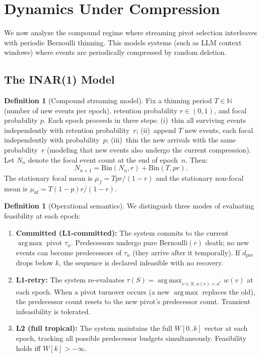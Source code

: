 \documentclass[11pt]{article}
\theoremstyle{plain}
\theoremstyle{definition}
\newtheorem{definition}[theorem]{Definition}
\theoremstyle{remark}
\newcommand{\N}{\mathbb{N}}
\newcommand{\dpre}[1][]{d_{\mathrm{pre}#1}}
\DeclareMathOperator*{\argmax}{arg\,max}
\begin{document}
\section{Dynamics Under Compression}\label{sec:dynamics}

We now analyze the compound regime where streaming pivot selection
interleaves with periodic Bernoulli thinning.  This models systems
(such as LLM context windows) where events are periodically compressed
by random deletion.

\subsection{The INAR(1) Model}\label{subsec:inar}

\begin{definition}[Compound streaming model]\label{def:compound}
Fix a thinning period $T \in \N$ (number of new events per epoch),
retention probability $r \in (0,1)$, and focal probability $p$.  Each
epoch proceeds in three steps: (i)~thin all surviving events
independently with retention probability~$r$; (ii)~append $T$ new
events, each focal independently with probability~$p$; (iii)~thin the
new arrivals with the same probability~$r$ (modeling that new events
also undergo the current compression).  Let $N_n$ denote the focal
event count at the end of epoch~$n$.  Then:
\begin{equation}\label{eq:inar}
  N_{n+1} = \mathrm{Bin}(N_n, r) + \mathrm{Bin}(T, pr).
\end{equation}
The stationary focal mean is $\mu_f = Tpr/(1-r)$ and the stationary
non-focal mean is $\mu_{\mathrm{nf}} = T(1-p)r/(1-r)$.
\end{definition}

\begin{definition}[Operational semantics]\label{def:operational-semantics}
We distinguish three modes of evaluating feasibility at each epoch:
\begin{enumerate}[label=(\alph*),nosep]
  \item \textbf{Committed (L1-committed):} The system commits to the
    current $\argmax$ pivot $\tau_n$.  Predecessors undergo pure
    Bernoulli$(r)$ death; no new events can become predecessors of
    $\tau_n$ (they arrive after it temporally).  If $\dpre$ drops below
    $k$, the sequence is declared infeasible with no recovery.
  \item \textbf{L1-retry:} The system re-evaluates
    $\tau(S) = \argmax_{v \in S,\, a(v) = a^*} w(v)$ at each epoch.
    When a pivot turnover occurs (a new $\argmax$ replaces the old), the
    predecessor count resets to the new pivot's predecessor count.
    Transient infeasibility is tolerated.
  \item \textbf{L2 (full tropical):} The system maintains the
    full $W[0..k]$ vector at each epoch, tracking all possible
    predecessor budgets simultaneously.  Feasibility holds iff
    $W[k] > -\infty$.
\end{enumerate}
\end{definition}
\end{document}
